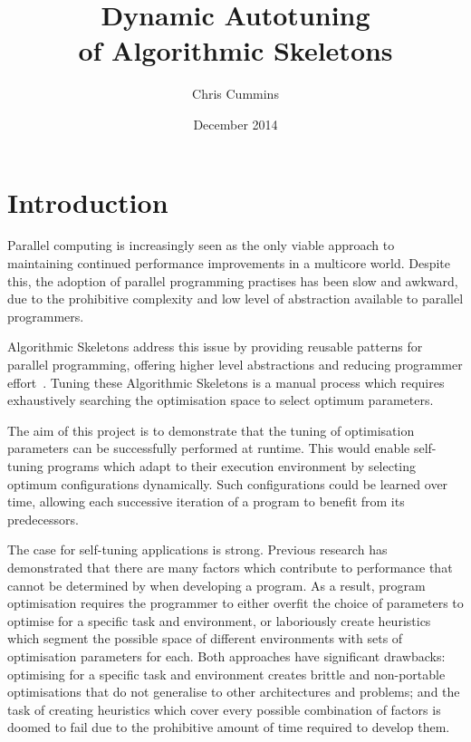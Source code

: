 
\author{Chris Cummins}

\date{December 2014}

\title{Dynamic Autotuning\\of Algorithmic Skeletons}

\newcommand{\subtitle}{MSc Research Proposal}

\newcommand{\degreeTitle}{MSc by Research\\ Pervasive Parallelism}

\newcommand{\institution}{School of Informatics,\\
  The University of Edinburgh}



\section{Introduction}
Parallel computing is increasingly seen as the only viable approach to
maintaining continued performance improvements in a multicore
world. Despite this, the adoption of parallel programming practises
has been slow and awkward, due to the prohibitive complexity and low
level of abstraction available to parallel programmers.

Algorithmic Skeletons address this issue by providing reusable
patterns for parallel programming, offering higher level abstractions
and reducing programmer effort~\cite{Cole1989, Cole2004}. Tuning these
Algorithmic Skeletons is a manual process which requires exhaustively
searching the optimisation space to select optimum parameters.

The aim of this project is to demonstrate that the tuning of
optimisation parameters can be successfully performed at runtime. This
would enable self-tuning programs which adapt to their execution
environment by selecting optimum configurations dynamically. Such
configurations could be learned over time, allowing each successive
iteration of a program to benefit from its predecessors.

The case for self-tuning applications is strong. Previous research has
demonstrated that there are many factors which contribute to
performance that cannot be determined by when developing a program. As
a result, program optimisation requires the programmer to either
overfit the choice of parameters to optimise for a specific task and
environment, or laboriously create heuristics which segment the
possible space of different environments with sets of optimisation
parameters for each. Both approaches have significant drawbacks:
optimising for a specific task and environment creates brittle and
non-portable optimisations that do not generalise to other
architectures and problems; and the task of creating heuristics which
cover every possible combination of factors is doomed to fail due to
the prohibitive amount of time required to develop them.

